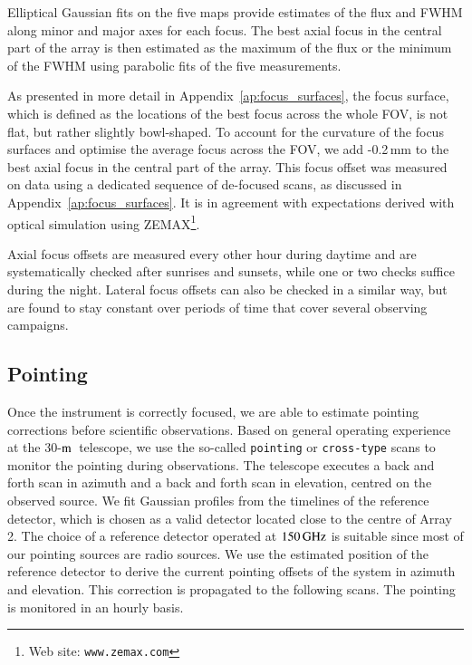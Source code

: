 \documentclass[traditionalabstract]{aa}
\newcommand{\trentemetre}{30-$\rm{m}$}
\newcommand{\lp}[1]{#1}
\newcommand{\LEt}[1]{{\bf {\color[RGB]{0, 153, 255} #1}}}
\begin{document}
Elliptical Gaussian fits on the five maps provide estimates of
the flux and FWHM along minor and major axes for each focus. 
The best axial focus in the central part of the array is then
estimated as the maximum of the flux or the minimum of the FWHM using
parabolic fits of the five measurements.

As presented in more detail in Appendix~\ref{ap:focus_surfaces}, the focus
surface, which is defined as the locations of the best focus across the whole FOV,
is not flat, but rather slightly bowl-shaped.
To account for the curvature of the focus surfaces and optimise the
average focus across the FOV, we add -0.2\,mm to the best axial focus
in the central part of the array. This focus offset was measured on data using
a dedicated sequence of de-focused scans, as discussed in
Appendix~\ref{ap:focus_surfaces}. It is in agreement with expectations
derived with optical simulation using ZEMAX\footnote{Web site: \tt{www.zemax.com}}. 

{\lp Axial focus offsets are measured every other hour during daytime and
are systematically checked after sunrises and sunsets, while one or
two checks suffice during the night. 
Lateral focus offsets can also be checked in a similar way, but are
found to stay constant over periods of time that cover several
observing campaigns.}


\subsection{Pointing}
\label{se:pointing}

Once the instrument is correctly focused, we are able to %
estimate pointing corrections before scientific observations.
Based on general operating experience at the \trentemetre\ telescope, we use the so-called
{\tt pointing} or {\tt cross-type} scans to monitor the pointing during observations. The
telescope executes a back and forth scan in azimuth and a back and forth scan in
elevation, centred on the observed source. We fit Gaussian profiles
from the timelines of the reference detector, which is chosen as a
valid detector located close to the centre of Array 2. {The choice of
a reference detector operated at $150\,\rm{GHz}$ is suitable since most
of our pointing sources are radio sources.} We use the
estimated position of the reference detector to derive the current pointing
offsets of the system in azimuth and elevation. This correction is
propagated to the following scans. The pointing is monitored in an
hourly basis.
\end{document}
